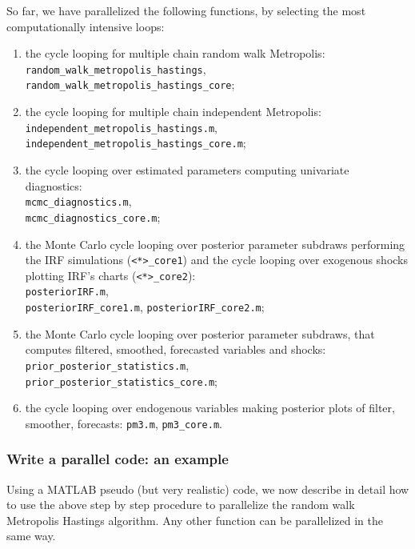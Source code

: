 \documentclass[12pt,a4paper,pdftex]{article}
\begin{document}
So far, we have parallelized the following functions, by selecting the most computationally intensive loops:
\begin{enumerate}
\item the cycle looping for multiple chain random walk Metropolis:\\
\verb"random_walk_metropolis_hastings", \\
\verb"random_walk_metropolis_hastings_core";
\item the cycle looping for multiple chain independent Metropolis:\\
\verb"independent_metropolis_hastings.m", \\
\verb"independent_metropolis_hastings_core.m";
\item the cycle looping over estimated parameters computing univariate diagnostics:\\
\verb"mcmc_diagnostics.m", \\
\verb"mcmc_diagnostics_core.m";
\item the Monte Carlo cycle looping over posterior parameter subdraws performing the IRF simulations (\verb"<*>_core1") and the cycle looping over exogenous shocks plotting IRF's charts (\verb"<*>_core2"):\\
\verb"posteriorIRF.m", \\\verb"posteriorIRF_core1.m", \verb"posteriorIRF_core2.m";
\item the Monte Carlo cycle looping over posterior parameter subdraws, that computes filtered, smoothed, forecasted variables and shocks:\\
\verb"prior_posterior_statistics.m", \\
\verb"prior_posterior_statistics_core.m";
\item the cycle looping over endogenous variables making posterior plots of filter, smoother, forecasts:
\verb"pm3.m", \verb"pm3_core.m".
\end{enumerate}

\subsubsection{Write a parallel code: an example}
%
%
Using a MATLAB pseudo (but very realistic) code, we now describe in detail how to use the above step by step procedure to parallelize the random walk Metropolis Hastings algorithm. Any other function can be parallelized in the same way.
\end{document}
